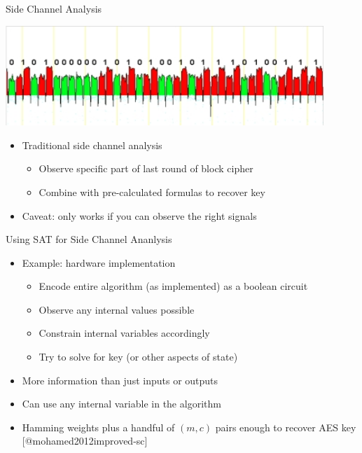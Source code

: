 \documentclass[ignorenonframetext,]{beamer}
\providecommand{\tightlist}{%
  \setlength{\itemsep}{0pt}\setlength{\parskip}{0pt}}
\begin{document}
\begin{frame}{Side Channel Analysis}

\begin{center}
\includegraphics[width=0.9\textwidth]{images/sidechannel.jpg}
\end{center}

\begin{itemize}
\tightlist
\item
  Traditional side channel analysis

  \begin{itemize}
  \tightlist
  \item
    Observe specific part of last round of block cipher
  \item
    Combine with pre-calculated formulas to recover key
  \end{itemize}
\item
  Caveat: only works if you can observe the right signals
\end{itemize}

\end{frame}

\begin{frame}{Using SAT for Side Channel Ananlysis}

\begin{itemize}
\tightlist
\item
  Example: hardware implementation

  \begin{itemize}
  \tightlist
  \item
    Encode entire algorithm (as implemented) as a boolean circuit
  \item
    Observe any internal values possible
  \item
    Constrain internal variables accordingly
  \item
    Try to solve for key (or other aspects of state)
  \end{itemize}
\item
  More information than just inputs or outputs
\item
  Can use \alert{any internal variable} in the algorithm
\item
  Hamming weights plus a handful of \((m, c)\) pairs enough to recover
  AES key {[}@mohamed2012improved-sc{]}
\end{itemize}

\end{frame}
\end{document}
